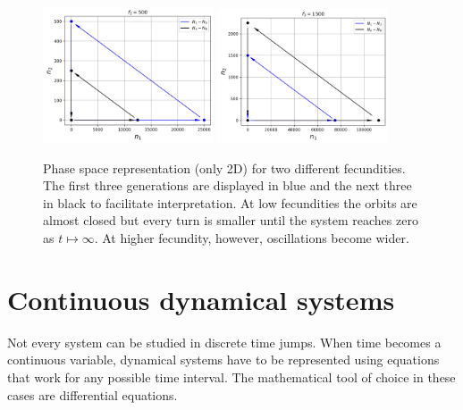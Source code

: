 \documentclass{tufte-book} %
\begin{document}
\begin{figure}
	\begin{center}
		\includegraphics[width=0.45\textwidth]{locusts_phaseIdec}
		\includegraphics[width=0.45\textwidth]{locusts_phaseIinc}
	\end{center}
	\caption{Phase space representation (only 2D) for two different fecundities. The first three generations are displayed in blue and the next three in black to facilitate interpretation. At low fecundities the orbits are almost closed but every turn is smaller until the system reaches zero as $t \mapsto \infty$. At higher fecundity, however, oscillations become wider.}
	 
	\label{fig:Llocusts_stability_pp}
\end{figure}

\FloatBarrier


\chapter{Continuous dynamical systems}

Not every system can be studied in discrete time jumps. When time becomes a continuous variable, dynamical systems have to be represented using equations that work for any possible time interval. The mathematical tool of choice in these cases are differential equations.
\end{document}

